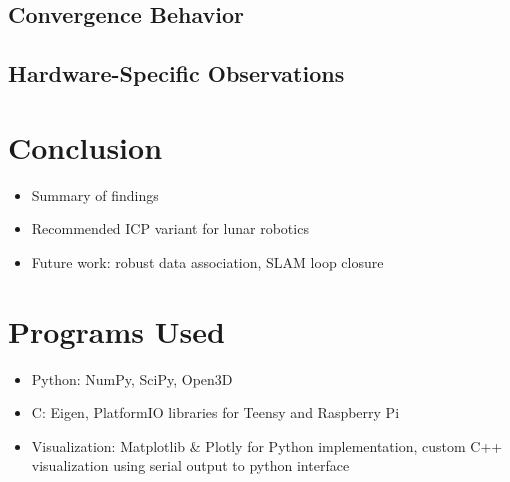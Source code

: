 \documentclass[11pt]{article}
\begin{document}
\subsection{Convergence Behavior}
\subsection{Hardware-Specific Observations}

\section{Conclusion}
\begin{itemize}
  \item Summary of findings
  \item Recommended ICP variant for lunar robotics
  \item Future work: robust data association, SLAM loop closure
\end{itemize}




\appendix
\section{Programs Used}
\begin{itemize}
  \item Python: NumPy, SciPy, Open3D
  \item C: Eigen, PlatformIO libraries for Teensy and Raspberry Pi
  \item Visualization: Matplotlib \& Plotly for Python implementation, custom C++ visualization using serial output to python interface
\end{itemize}
\end{document}
